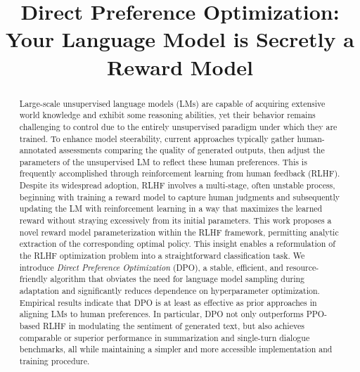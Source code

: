 \title{Direct Preference Optimization: Your Language Model is Secretly a Reward Model}

\begin{abstract}
Large-scale unsupervised language models (LMs) are capable of acquiring extensive world knowledge and exhibit some reasoning abilities, yet their behavior remains challenging to control due to the entirely unsupervised paradigm under which they are trained. To enhance model steerability, current approaches typically gather human-annotated assessments comparing the quality of generated outputs, then adjust the parameters of the unsupervised LM to reflect these human preferences. This is frequently accomplished through reinforcement learning from human feedback (RLHF). Despite its widespread adoption, RLHF involves a multi-stage, often unstable process, beginning with training a reward model to capture human judgments and subsequently updating the LM with reinforcement learning in a way that maximizes the learned reward without straying excessively from its initial parameters. This work proposes a novel reward model parameterization within the RLHF framework, permitting analytic extraction of the corresponding optimal policy. This insight enables a reformulation of the RLHF optimization problem into a straightforward classification task. We introduce \textit{Direct Preference Optimization} (DPO), a stable, efficient, and resource-friendly algorithm that obviates the need for language model sampling during adaptation and significantly reduces dependence on hyperparameter optimization. Empirical results indicate that DPO is at least as effective as prior approaches in aligning LMs to human preferences. In particular, DPO not only outperforms PPO-based RLHF in modulating the sentiment of generated text, but also achieves comparable or superior performance in summarization and single-turn dialogue benchmarks, all while maintaining a simpler and more accessible implementation and training procedure.
\end{abstract}

